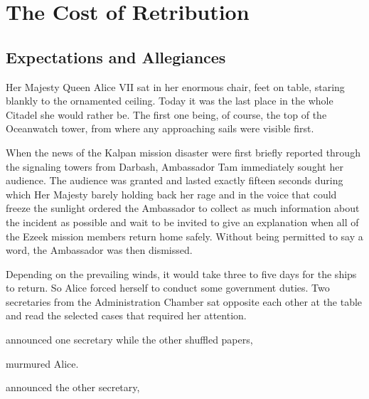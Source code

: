 \chapter{The Cost of Retribution}

\section{Expectations and Allegiances}

Her Majesty Queen Alice VII sat in her enormous chair, feet on table, staring blankly to the ornamented ceiling. Today it was the last place in the whole Citadel she would rather be. The first one being, of course, the top of the Oceanwatch tower, from where any approaching sails were visible first.

When the news of the Kalpan mission disaster were first briefly reported through the signaling towers from Darbash, Ambassador Tam immediately sought her audience. The audience was granted and lasted exactly fifteen seconds during which Her Majesty barely holding back her rage and in the voice that could freeze the sunlight ordered the Ambassador to collect as much information about the incident as possible and wait to be invited to give an explanation when all of the Ezeek mission members return home safely. Without being permitted to say a word, the Ambassador was then dismissed.

Depending on the prevailing winds, it would take three to five days for the ships to return. So Alice forced herself to conduct some government duties. Two secretaries from the Administration Chamber sat opposite each other at the table and read the selected cases that required her attention.

 announced one secretary while the other shuffled papers, 

 murmured Alice.

 announced the other secretary, 


